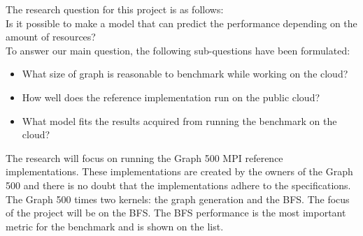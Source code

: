 The research question for this project is as follows: \\
Is it possible to make a model that can predict the performance depending on the amount of resources? \\
To answer our main question, the following sub-questions have been formulated: 
\begin{itemize}
\item What size of graph is reasonable to benchmark while working on the cloud?
\item How well does the reference implementation\cite{graph500-code} run on the public cloud?
\item What model fits the results acquired from running the benchmark on the cloud?
\end{itemize}

The research will focus on running the Graph 500 MPI reference implementations. These implementations are created by the owners of the Graph 500 and there is no doubt that the implementations adhere to the specifications. The Graph 500 times two kernels: the graph generation and the BFS. The focus of the project will be on the BFS. The BFS performance is the most important metric for the benchmark and is shown on the list.